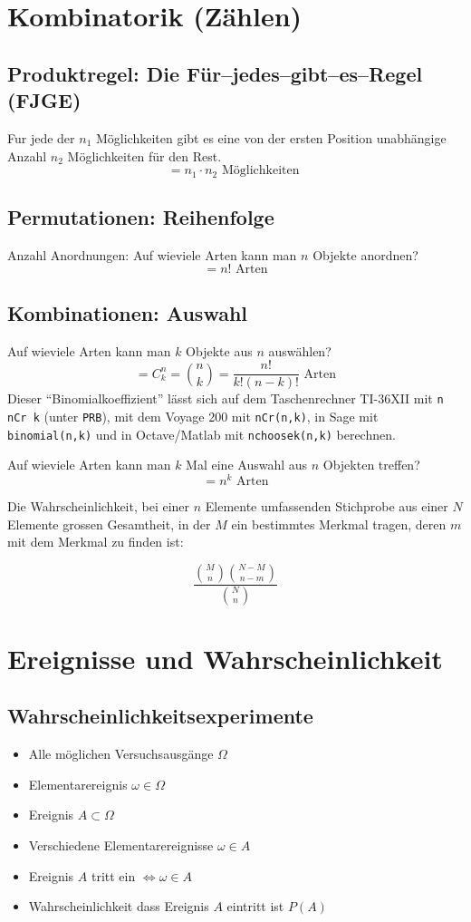 \section{Kombinatorik (Zählen)}
\subsection{Produktregel: Die Für–jedes–gibt–es–Regel (FJGE)}
Fur jede der $n_1$ Möglichkeiten gibt es eine von der
ersten Position unabhängige Anzahl $n_2$ Möglichkeiten für den Rest.
\[ = n_1 \cdot n_2 \text{ Möglichkeiten } \]

\subsection{Permutationen: Reihenfolge}
Anzahl Anordnungen: Auf wieviele Arten kann man $n$ Objekte anordnen?
\[ = n! \text{ Arten} \]

\subsection{Kombinationen: Auswahl}
Auf wieviele Arten kann man $k$ Objekte aus $n$ auswählen?
\[ = C^n_k=\binom{n}{k} = \frac{n!}{k!(n-k)!} \text{ Arten} \]
Dieser "`Binomialkoeffizient"' lässt sich auf dem Taschenrechner
TI-36XII mit \texttt{n nCr k} (unter \texttt{PRB}), mit dem Voyage 200
mit \texttt{nCr(n,k)}, in Sage mit \texttt{binomial(n,k)} und in 
Octave/Matlab mit \texttt{nchoosek(n,k)} berechnen.

Auf wieviele Arten kann man $k$ Mal eine Auswahl aus $n$ Objekten
treffen?
\[ = n^k \text{ Arten} \]

Die Wahrscheinlichkeit, bei einer $n$ Elemente umfassenden Stichprobe
aus einer $N$ Elemente grossen Gesamtheit, in der $M$ ein bestimmtes
Merkmal tragen, deren $m$ mit dem Merkmal zu finden ist:

\[ \frac{\binom{M}{n} \binom{N-M}{n-m}}{\binom{N}{n}} \]

\section{Ereignisse und Wahrscheinlichkeit}
\subsection{Wahrscheinlichkeitsexperimente}
\begin{itemize}
  \item Alle möglichen Versuchsausgänge $\Omega$
  \item Elementarereignis $\omega \in \Omega$
  \item Ereignis $A \subset \Omega$
  \item Verschiedene Elementarereignisse $\omega \in A$
  \item Ereignis $A$ tritt ein $\Leftrightarrow \omega \in A$
  \item Wahrscheinlichkeit dass Ereignis $A$ eintritt ist $P(A)$
\end{itemize}

